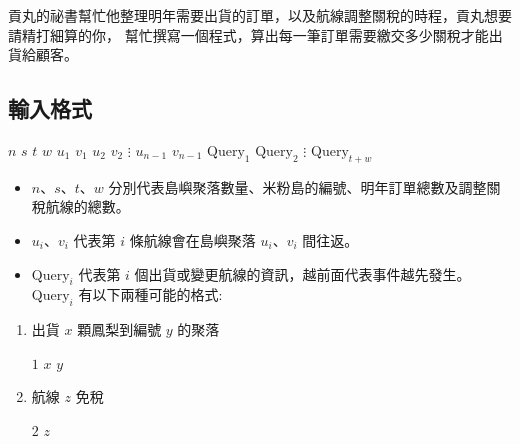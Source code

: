 貢丸的祕書幫忙他整理明年需要出貨的訂單，以及航線調整關稅的時程，貢丸想要請精打細算的你，
幫忙撰寫一個程式，算出每一筆訂單需要繳交多少關稅才能出貨給顧客。

\subsection{輸入格式}

\begin{format}
\f{
$n$ $s$ $t$ $w$
$u_1$ $v_1$
$u_2$ $v_2$
$\vdots$
$u_{n-1}$ $v_{n-1}$
$\textrm{Query}_1$
$\textrm{Query}_2$
$\vdots$
$\textrm{Query}_{t+w}$
}
\end{format}

\begin{itemize}
\tightlist
\item
  \begin{math}n\end{math}、\begin{math}s\end{math}、\begin{math}t\end{math}、\begin{math}w\end{math}
  分別代表島嶼聚落數量、米粉島的編號、明年訂單總數及調整關稅航線的總數。
\item
  \begin{math}u_i\end{math}、\begin{math}v_i\end{math} 代表第
  \begin{math}i\end{math} 條航線會在島嶼聚落
  \begin{math}u_i\end{math}、\begin{math}v_i\end{math} 間往返。
\item
  \(\textrm{Query}_i\) 代表第 \begin{math}i\end{math}
  個出貨或變更航線的資訊，越前面代表事件越先發生。\(\textrm{Query}_i\)
  有以下兩種可能的格式:
\end{itemize}

\begin{enumerate}
\def\labelenumi{\arabic{enumi}.}
\tightlist
\item
  出貨 \begin{math}x\end{math} 顆鳳梨到編號 \begin{math}y\end{math}
  的聚落

  \begin{format}
  \f{
  $1$ $x$ $y$
  }
  \end{format}
\item
  航線 \begin{math}z\end{math} 免稅

  \begin{format}
  \f{
  $2$ $z$
  }
  \end{format}
\end{enumerate}


